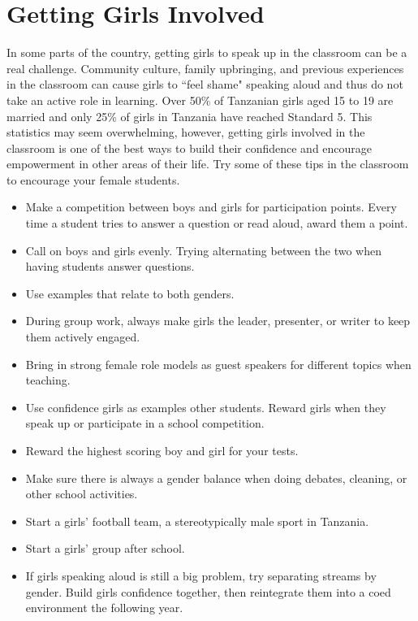 \chapter{Getting Girls Involved}
In some parts of the country, getting girls to speak up in the classroom can be a real challenge.  Community culture, family upbringing, and previous experiences in the classroom can cause girls to ``feel shame" speaking aloud and thus do not take an active role in learning.  Over 50\% of Tanzanian girls aged 15 to 19 are married and only 25\% of girls in Tanzania have reached Standard 5. This statistics may seem overwhelming, however, getting girls involved in the classroom is one of the best ways to build their confidence and encourage empowerment in other areas of their life.  Try some of these tips in the classroom to encourage your female students.

\begin{itemize}
 \item Make a competition between boys and girls for participation points.  Every time a student tries to answer a question or read aloud, award them a point.  
 \item Call on boys and girls evenly.  Trying alternating between the two when having students answer questions.
 \item Use examples that relate to both genders.
 \item During group work, always make girls the leader, presenter, or writer to keep them actively engaged.
 \item Bring in strong female role models as guest speakers for different topics when teaching.
 \item Use confidence girls as examples other students. Reward girls when they speak up or participate in a school competition.
 \item Reward the highest scoring boy and girl for your tests.
 \item Make sure there is always a gender balance when doing debates, cleaning, or other school activities.
 \item Start a girls' football team, a stereotypically male sport in Tanzania.
 \item Start a girls' group after school.
 \item If girls speaking aloud is still a big problem, try separating streams by gender.  Build girls confidence together, then reintegrate them into a coed environment the following year.  
\end{itemize}

